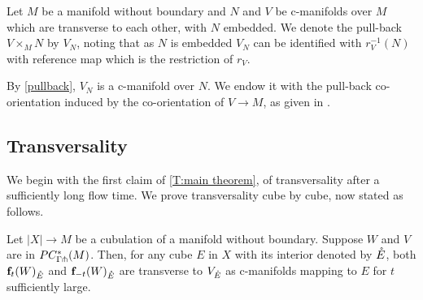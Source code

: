 \begin{definition}
	Let $M$ be a manifold without boundary and $N$ and $V$ be c-manifolds over $M$ which are transverse to each
	other,  with $N$ embedded.
	We  denote the pull-back $V \times_M N$ by $V_N$, noting that as $N$ is embedded $V_N$ can be identified with $r_V^{-1}(N)$ with  reference map which  is the restriction of $r_V$. %

	By \cref{pullback}, $V_N$ is a c-manifold over $N$.  We endow it with the pull-back co-orientation induced by the co-orientation of $V\to M$,  as given in  \cite[Sections 3.5.1 and 3.5.2]{medina2022foundations}. %
\end{definition}

\subsection{Transversality}

We begin with the first claim of \cref{T:main theorem}, of transversality after a sufficiently long flow time.
We prove transversality cube by cube, now stated as follows.


\begin{theorem}\label{T:transversality}
	Let $|X| \to M$ be a cubulation of a manifold without boundary.
	Suppose $W$ and $V$ are in $PC_{\Gamma \pitchfork}^*(M)$.
	Then, for any cube $E$ in $X$ with its interior denoted by $\mathring{E}$, both $\mathbf{f}_t(W)_{\mathring{E}}$ and $\mathbf{f}_{-t}(W)_{\mathring{E}}$ are transverse to $V_{\mathring{E}}$ as c-manifolds mapping to $E$  for $t$ sufficiently large.
\end{theorem}


